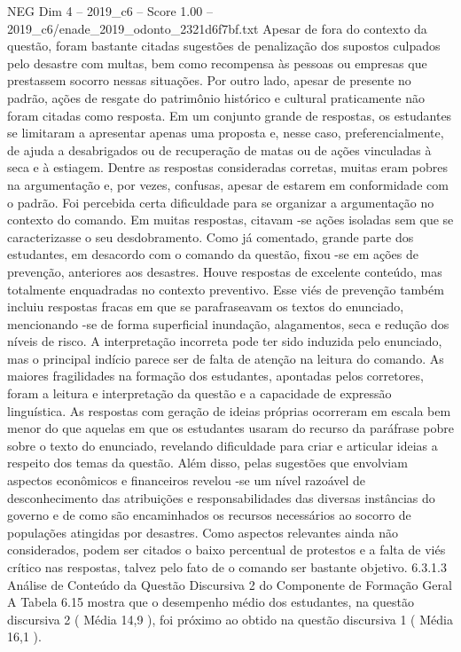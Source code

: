\begin{textsample}{NEG Dim 4 – 2019\_c6 – Score 1.00 – 2019\_c6/enade\_2019\_odonto\_2321d6f7bf.txt}
Apesar de fora do contexto da questão, foram bastante citadas sugestões de penalização dos supostos culpados pelo desastre com multas, bem como recompensa às pessoas ou empresas que prestassem socorro nessas situações.
Por outro lado, apesar de presente no padrão, ações de resgate do patrimônio histórico e cultural praticamente não foram citadas como resposta.
Em um conjunto grande de respostas, os estudantes se limitaram a apresentar apenas uma proposta e, nesse caso, preferencialmente, de ajuda a desabrigados ou de recuperação de matas ou de ações vinculadas à seca e à estiagem.
Dentre as respostas consideradas corretas, muitas eram pobres na argumentação e, por vezes, confusas, apesar de estarem em conformidade com o padrão.
Foi percebida certa dificuldade para se organizar a argumentação no contexto do comando.
Em muitas respostas, citavam -se ações isoladas sem que se caracterizasse o seu desdobramento.
Como já comentado, grande parte dos estudantes, em desacordo com o comando da questão, fixou -se em ações de prevenção, anteriores aos desastres.
Houve respostas de excelente conteúdo, mas totalmente enquadradas no contexto preventivo.
Esse viés de prevenção também incluiu respostas fracas em que se parafraseavam os textos do enunciado, mencionando -se de forma superficial inundação, alagamentos, seca e redução dos níveis de risco.
A interpretação incorreta pode ter sido induzida pelo enunciado, mas o principal indício parece ser de falta de atenção na leitura do comando.
As maiores fragilidades na formação dos estudantes, apontadas pelos corretores, foram a leitura e interpretação da questão e a capacidade de expressão linguística.
As respostas com geração de ideias próprias ocorreram em escala bem menor do que aquelas em que os estudantes usaram do recurso da paráfrase pobre sobre o texto do enunciado, revelando dificuldade para criar e articular ideias a respeito dos temas da questão.
Além disso, pelas sugestões que envolviam aspectos econômicos e financeiros revelou -se um nível razoável de desconhecimento das atribuições e responsabilidades das diversas instâncias do governo e de como são encaminhados os recursos necessários ao socorro de populações atingidas por desastres.
Como aspectos relevantes ainda não considerados, podem ser citados o baixo percentual de protestos e a falta de viés crítico nas respostas, talvez pelo fato de o comando ser bastante objetivo. 6.3.1.3 Análise de Conteúdo da Questão Discursiva 2 do Componente de Formação Geral A Tabela 6.15 mostra que o desempenho médio dos estudantes, na questão discursiva 2 ( Média 14,9 ), foi próximo ao obtido na questão discursiva 1 ( Média 16,1 ).

\end{textsample}
